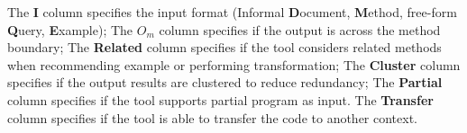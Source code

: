 \begin{table}[ht]
\begin{center}
{%
The {\bf I} column specifies the input  format (Informal {\bf D}ocument, {\bf M}ethod, free-form {\bf Q}uery, {\bf E}xample); 
The {\bf $O_{m}$} column specifies if the  output is across the method boundary; The {\bf Related} column specifies if the tool considers related methods when recommending example or performing transformation; 
The {\bf Cluster} column specifies if the output results are clustered to reduce redundancy; 
The {\bf Partial} column specifies if the tool supports partial program as input.
The {\bf Transfer} column specifies if the tool is able to transfer the code to another context.
}
 \end{center}
\end{table}






